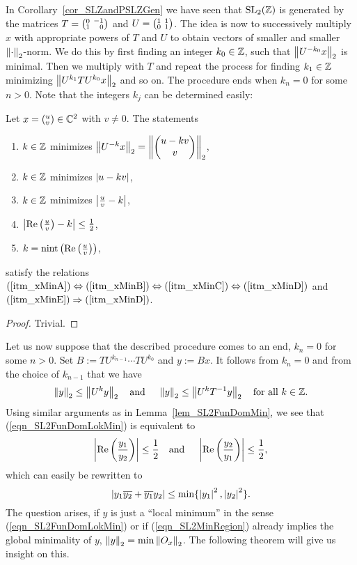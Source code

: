 In Corollary~\ref{cor_SLZandPSLZGen} we have seen that $\SL{\Z}$ is generated by the matrices $T = \smallmat{0}{-1}{1}{\phantom{-}0}$ and $U = \smallmat{1}{1}{0}{1}$. The idea is now to successively multiply $x$ with appropriate powers of $T$ and $U$ to obtain vectors of smaller and smaller $\eucnorm{\cdot}$-norm. We do this by first finding an integer $k_0 \in \Z$, such that $\eucnorm{U^{-k_0}x}$ is minimal. Then we multiply with $T$ and repeat the process for finding $k_1 \in \Z$ minimizing $\eucnorm{U^{k_1} T U^{k_0} x}$ and so on. The procedure ends when $k_n = 0$ for some $n>0$. Note that the integers $k_j$ can be determined easily:
\begin{lemma}
\label{lem_SL2FunDomMin}
Let $x = ({}^u_v)\in \C^2$ with $v \ne 0$. The statements
\begin{enumerate}[\qquad(i)]
\item \label{itm_xMinA}
$k \in \Z$ minimizes $\eucnorm{U^{-k}x} = \eucnorm{\cvec{u - k v}{v}}$,
\item \label{itm_xMinB} $k \in \Z$ minimizes $\abs{u - k v}$,
\item \label{itm_xMinC} $k \in \Z$ minimizes $\abs{\frac{u}{v} - k}$,
\item \label{itm_xMinD} $\abs{\Re{\frac{u}{v}} - k} \le \reci{2}$,
\item \label{itm_xMinE} $k = \nint{\Re{\frac{u}{v}}}$,
\end{enumerate}
satisfy the relations $(\ref{itm_xMinA}) \Leftrightarrow (\ref{itm_xMinB}) \Leftrightarrow (\ref{itm_xMinC}) \Leftrightarrow (\ref{itm_xMinD})$ and $(\ref{itm_xMinE}) \Rightarrow (\ref{itm_xMinD})$.
\end{lemma}
\begin{proof}
Trivial.
\end{proof}
Let us now suppose that the described procedure comes to an end, \ie $k_n = 0$ for some $n > 0$. Set $B  := TU^{k_{n-1}} \cdots TU^{k_0}$ and $y :=  Bx$. It follows from $k_n = 0$ and from the choice of $k_{n-1}$ that we have 
\begin{equation}
\label{eqn_SL2FunDomLokMin}
\eucnorm{y} \le \eucnorm{U^k y} \text{\quad and \quad} \eucnorm{y} \le \eucnorm{U^k \inv{T} y} \text{\quad for all } k \in \Z.
\end{equation}
Using similar arguments as in Lemma~\ref{lem_SL2FunDomMin}, we see that (\ref{eqn_SL2FunDomLokMin}) is equivalent to
\begin{equation*}
\abs{\Re{\frac{y_1}{y_2}}} \le \reci{2} \text{\quad and \quad} \abs{\Re{\frac{y_2}{y_1}}} \le \reci{2},
\end{equation*}
which can easily be rewritten to
\begin{equation}
\label{eqn_SL2MinRegion}
\abs{y_1 \conj{y_2} + \conj{y_1} y_2} \le \min\{\abs{y_1}^2, \abs{y_2}^2\}.
\end{equation}
The question arises, if $y$ is just a ``local minimum'' in the sense (\ref{eqn_SL2FunDomLokMin}) or if (\ref{eqn_SL2MinRegion}) already implies the global minimality of $y$, \ie $\eucnorm{y} = \min \eucnorm{O_x}$. The following theorem will give us insight on this.

